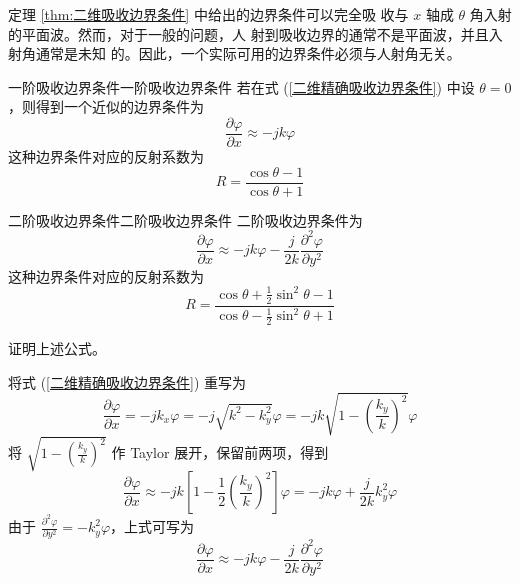 \par 定理 \ref{thm:二维吸收边界条件} 中给出的边界条件可以完全吸
收与 $x$ 轴成 $\theta$ 角入射的平面波。然而，对于一般的问题，人
射到吸收边界的通常不是平面波，并且入射角通常是未知
的。因此，一个实际可用的边界条件必须与人射角无关。

\begin{theorem}{一阶吸收边界条件}{一阶吸收边界条件}
    若在式 (\ref{二维精确吸收边界条件}) 中设 $\theta=0$，则得到一个近似的边界条件为
    \begin{equation}
        \frac{\partial \varphi}{\partial x}
        \approx-jk\varphi
        \label{一阶频域吸收边界条件}
    \end{equation}
    这种边界条件对应的反射系数为
    \begin{equation}
        R=\frac{\cos \theta -1}{\cos \theta +1}
    \end{equation}
\end{theorem}

\begin{theorem}{二阶吸收边界条件}{二阶吸收边界条件}
    二阶吸收边界条件为
    \begin{equation}
        \frac{\partial \varphi}{\partial x}
        \approx-jk\varphi
        -\frac{j}{2k}\frac{\partial^2 \varphi}{\partial y^2}
        \label{二阶频域吸收边界条件}
    \end{equation}
    这种边界条件对应的反射系数为
    \begin{equation}
        R=\frac{\cos \theta +\frac{1}{2}\sin^2\theta-1}
        {\cos \theta -\frac{1}{2}\sin^2\theta+1}
    \end{equation}
\end{theorem}

\begin{exercise}
    证明上述公式。
\end{exercise}

\begin{solution}
    将式 (\ref{二维精确吸收边界条件}) 重写为
    \begin{equation*}
        \frac{\partial \varphi}{\partial x}
        =-jk_x\varphi
        =-j\sqrt{k^2-k_y^2}\varphi
        =-jk\sqrt{1-\left(\frac{k_y}{k}\right)^2}\varphi
    \end{equation*}
    将 $\sqrt{1-\left(\frac{k_y}{k}\right)^2}$ 作 Taylor 展开，保留前两项，得到
    \begin{equation*}
        \frac{\partial \varphi}{\partial x}
        \approx -jk\left[
            1-\frac{1}{2}\left(\frac{k_y}{k}\right)^2
        \right]\varphi
        =-jk\varphi+\frac{j}{2k}k_y^2\varphi
    \end{equation*}
    由于 $\frac{\partial^2 \varphi}{\partial y^2}=-k_y^2\varphi$，上式可写为
    \begin{equation*}
        \frac{\partial \varphi}{\partial x}
        \approx -jk\varphi-\frac{j}{2k}\frac{\partial^2 \varphi}{\partial y^2}
    \end{equation*}
\end{solution}

